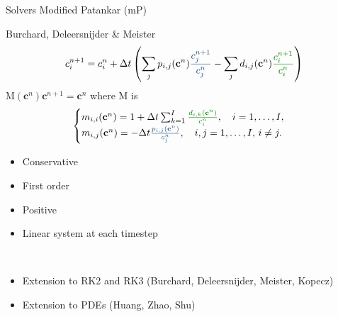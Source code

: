 \documentclass[9pt,compress,t,aspectratio=169]{beamer}
\newcommand{\1}{\begin{pmatrix}
                 1\\
                 1
                \end{pmatrix}}
\def\bc{\mathbf{c}}
\def\M{\mathrm{M}}
\begin{document}
\begin{frame}{Solvers}
Modified Patankar (mP)

Burchard, Deleersnijder \& Meister
\begin{equation}
\begin{split}
c_i^{n+1}= c_i^n +\Delta t \left( \sum_{j} p_{i,j} (\bc^{n}) {\color{lightblue}\frac{c_j^{n+1}}{c_j^n}} -\sum_j d_{i,j}(\bc^{n}){\color{lightgreen}\frac{c_i^{n+1}}{c_i^n}}\right )
\end{split}
\end{equation}
$\M(\bc^n) \bc^{n+1}=\bc^n$ where $\M$ is
\begin{equation}\label{eq:mass_matrix_mod_patankar}
\begin{cases}
m_{i,i}(\bc^n) = 1+\Delta t \sum_{k=1}^I {\color{lightgreen}\frac{d_{i,k}(\bc^n)}{c_i^n}} , \quad i=1,\dots, I,\\
m_{i,j}(\bc^n) = - \Delta t {\color{lightblue}\frac{p_{i,j}(\bc^n)}{c_j^n}} , \quad i,j=1,\dots , I ,\, i\neq j.
\end{cases}
\end{equation}
\begin{minipage}{0.4\textwidth}
\begin{itemize}
\item Conservative
\item First order
\item Positive
\item Linear system at each timestep
\end{itemize}
\end{minipage}\,
\begin{minipage}{0.58\textwidth}
	\begin{itemize}
		\item Extension to RK2 and RK3 (Burchard, Deleersnijder, Meister, Kopecz)
		\item Extension to PDEs (Huang, Zhao, Shu)
	\end{itemize}
\end{minipage}

\end{frame}
\end{document}

